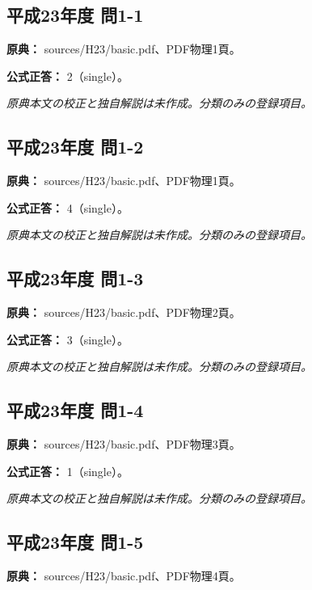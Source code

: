 \subsection{平成23年度 問1-1}
\label{q:h23-reg-basic-1-1}

\noindent\textbf{原典：} sources/H23/basic.pdf、PDF物理1頁。

\textbf{公式正答：} 2（single）。

\par\textit{原典本文の校正と独自解説は未作成。分類のみの登録項目。}

\subsection{平成23年度 問1-2}
\label{q:h23-reg-basic-1-2}

\noindent\textbf{原典：} sources/H23/basic.pdf、PDF物理1頁。

\textbf{公式正答：} 4（single）。

\par\textit{原典本文の校正と独自解説は未作成。分類のみの登録項目。}

\subsection{平成23年度 問1-3}
\label{q:h23-reg-basic-1-3}

\noindent\textbf{原典：} sources/H23/basic.pdf、PDF物理2頁。

\textbf{公式正答：} 3（single）。

\par\textit{原典本文の校正と独自解説は未作成。分類のみの登録項目。}

\subsection{平成23年度 問1-4}
\label{q:h23-reg-basic-1-4}

\noindent\textbf{原典：} sources/H23/basic.pdf、PDF物理3頁。

\textbf{公式正答：} 1（single）。

\par\textit{原典本文の校正と独自解説は未作成。分類のみの登録項目。}

\subsection{平成23年度 問1-5}
\label{q:h23-reg-basic-1-5}

\noindent\textbf{原典：} sources/H23/basic.pdf、PDF物理4頁。

